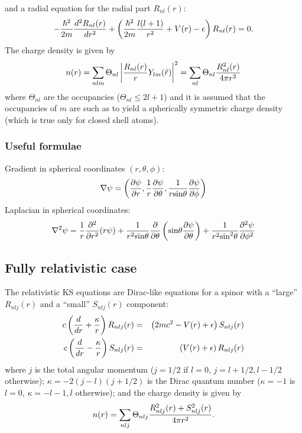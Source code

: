 \documentclass[12pt]{article}
\begin{document}
and a radial equation for the radial part $R_{nl}(r)$:
\begin{equation}
-{\hbar^2\over 2m} {d^2 R_{nl}(r)\over dr^2}
+\left( {\hbar^2\over 2m} {l(l+1)\over r^2} + V(r)-\epsilon
\right) R_{nl}(r) = 0.
\end{equation}
The charge density is given by
\begin{equation}
n(r) = \sum_{nlm} \Theta_{nl}\left |{R_{nl}(r)\over r}Y_{lm}(\hat r)\right|^2 
     = \sum_{nl} \Theta_{nl}{R^2_{nl}(r)\over 4\pi r^2}
\end{equation}
where $\Theta_{nl}$ are the occupancies ($\Theta_{nl}\le 2l+1$)
and it is assumed that the occupancies of $m$ are such as to yield
a spherically symmetric charge density (which is true only for closed
shell atoms).
\subsubsection{Useful formulae} 

Gradient in spherical coordinates $(r,\theta,\phi)$:
\begin{equation}
\nabla\psi = \left({\partial\psi\over\partial r},
                   {1\over r}{\partial\psi\over\partial\theta},
                   {1\over r \mbox{sin}\theta}
                              {\partial\psi\over\partial\phi}
             \right)
\end{equation}
Laplacian in spherical coordinates:
\begin{equation}
\nabla^2\psi = {1\over r} {\partial^2\over\partial r^2}(r\psi)
             + {1\over r^2\mbox{sin}\theta} {\partial\over\partial\theta}
               \left(\mbox{sin}\theta{\partial\psi\over\partial\theta}\right)
             + {1\over r^2\mbox{sin}^2\theta}
                {\partial^2\psi\over\partial\phi^2}
\end{equation}

\subsection{Fully relativistic case} 

The relativistic KS equations are
Dirac-like equations for a spinor with a ``large'' $R_{nlj}(r)$ and
a ``small'' $S_{nlj}(r)$ component:
\begin{eqnarray}
c\left({d \over dr} + {\kappa\over r}\right)R_{nlj}(r) & = & 
       \left(2mc^2 - V(r) + \epsilon \right)S_{nlj}(r)\\
c\left({d \over dr} - {\kappa\over r}\right)S_{nlj}(r) & = & 
       \left( V(r) + \epsilon \right)       R_{nlj}(r)
\end{eqnarray}
where $j$ is the total angular momentum ($j=1/2$ if $l=0$, 
$j=l+1/2,l-1/2$ otherwise); $\kappa=-2(j-l)(j+1/2)$ is the Dirac 
quantum number ($\kappa=-1$ is $l=0$, $\kappa=-l-1,l$ otherwise);
and the charge density is given by
\begin{equation}
  n(r) = \sum_{nlj} \Theta_{nlj}{R^2_{nlj}(r)+S^2_{nlj}(r)\over 4\pi r^2}.
\end{equation}
\end{document}
